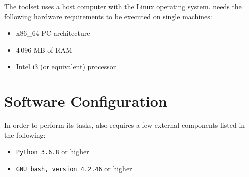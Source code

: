 The \DAMA toolset uses a host computer with the Linux operating system. \DAMA needs the following hardware requirements to be executed on single machines:

\begin{itemize}
	\item x86\_64 PC architecture
	\item 4\,096 MB of RAM
	\item Intel i3 (or equivalent) processor
\end{itemize}

%
%

\section{Software Configuration}

In order to perform its tasks, \DAMA also requires a few external components listed in the following:

\begin{itemize}
	\item \texttt{Python 3.6.8} or higher
	\item \texttt{GNU bash, version 4.2.46} or higher
\end{itemize}
